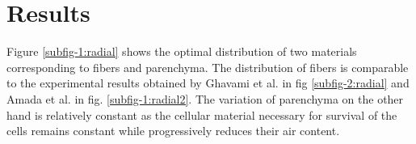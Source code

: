 \documentclass[openright,twoside]{iitkthesis}
\begin{document}
\section{Results}
Figure \ref{subfig-1:radial} shows the optimal distribution of two materials corresponding to fibers and parenchyma. The distribution of fibers is comparable to the experimental results obtained by Ghavami et al. \cite{ghavami2003bamboo} in fig \ref{subfig-2:radial} and Amada et al. \cite{amada1996mechanical} in fig. \ref{subfig-1:radial2}. The variation of parenchyma on the other hand is relatively constant as the cellular material necessary for survival of the cells remains constant while progressively reduces their air content.
\begin{figure}[H]
\begin{center}
     \vfill
\end{center}
\end{figure}
\end{document}
